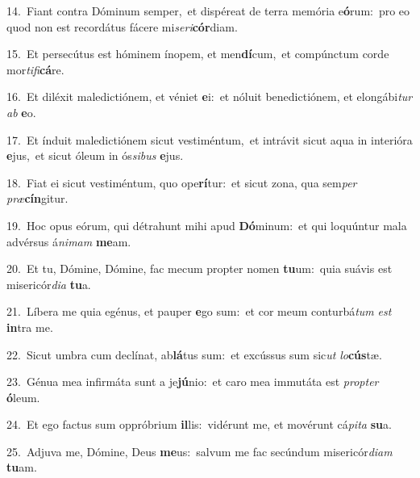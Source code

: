 {\numbfont\textcolor{\numbcolor}{14.}}~Fiant contra Dóminum semper,~\dagger et dispéreat de terra memória e\-\textbf{ó}\-rum:~\star pro eo quod non est recordátus fácere mi\-\textit{se}\-\textit{ri}\textbf{cór}diam.\par
{\numbfont\textcolor{\numbcolor}{15.}}~Et persecútus est hóminem ínopem, et men\-\textbf{dí}\-cum,~\star et compúnctum corde mor\-\textit{ti}\-\textit{fi}\textbf{cá}re.\par
{\numbfont\textcolor{\numbcolor}{16.}}~Et diléxit maledictiónem, et véniet \textbf{e}\-i:~\star et nóluit benedictiónem, et elongábi\textit{tur} \textit{ab} \textbf{e}\-o.\par
{\numbfont\textcolor{\numbcolor}{17.}}~Et índuit maledictiónem sicut vestiméntum,~\dagger et intrávit sicut aqua in interióra \textbf{e}\-jus,~\star et sicut óleum in ós\-\textit{si}\-\textit{bus} \textbf{e}\-jus.\par
{\numbfont\textcolor{\numbcolor}{18.}}~Fiat ei sicut vestiméntum, quo ope\-\textbf{rí}\-tur:~\star et sicut zona, qua sem\textit{per} \textit{præ}\-\textbf{cín}gitur.\par
{\numbfont\textcolor{\numbcolor}{19.}}~Hoc opus eórum, qui détrahunt mihi apud \textbf{Dó}\-minum:~\star et qui loquúntur mala advérsus á\-\textit{ni}\-\textit{mam} \textbf{me}\-am.\par
{\numbfont\textcolor{\numbcolor}{20.}}~Et tu, Dómine, Dómine, fac mecum propter nomen \textbf{tu}\-um:~\star quia suávis est misericór\-\textit{di}\-\textit{a} \textbf{tu}\-a.\par
{\numbfont\textcolor{\numbcolor}{21.}}~Líbera me quia egénus, et pauper \textbf{e}\-go sum:~\star et cor meum conturbá\textit{tum} \textit{est} \textbf{in}\-tra me.\par
{\numbfont\textcolor{\numbcolor}{22.}}~Sicut umbra cum declínat, ab\-\textbf{lá}\-tus sum:~\star et excússus sum sic\textit{ut} \textit{lo}\-\textbf{cús}tæ.\par
{\numbfont\textcolor{\numbcolor}{23.}}~Génua mea infirmáta sunt a je\-\textbf{jú}\-nio:~\star et caro mea immutáta est \textit{prop}\-\textit{ter} \textbf{ó}\-leum.\par
{\numbfont\textcolor{\numbcolor}{24.}}~Et ego factus sum oppróbrium \textbf{il}\-lis:~\star vidérunt me, et movérunt cá\-\textit{pi}\-\textit{ta} \textbf{su}\-a.\par
{\numbfont\textcolor{\numbcolor}{25.}}~Adjuva me, Dómine, Deus \textbf{me}\-us:~\star salvum me fac secúndum misericór\-\textit{di}\-\textit{am} \textbf{tu}\-am.\par
